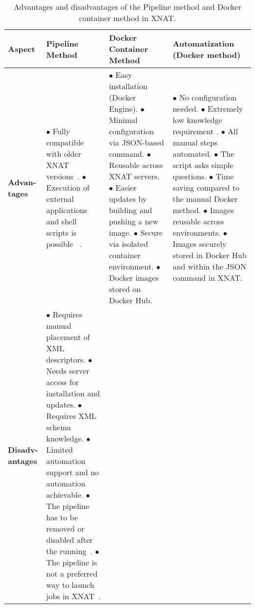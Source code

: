 \begin{table}[htbp]
\centering
\caption{Advantages and disadvantages of the Pipeline method and Docker container method in XNAT.}
\label{tab:adv-disadv}
\renewcommand{\arraystretch}{4}
\begin{tabular}{|p{1cm}|p{3cm}|p{5cm}|p{4cm}|}
\hline
\textbf{Aspect} & \textbf{Pipeline Method} & \textbf{Docker Container Method} & \textbf{Automatization (Docker method)} \\
\hline
\textbf{Advan-tages} &
\parbox[t]{3cm}{
$\bullet$ Fully compatible with older XNAT versions~\cite{Pipelinecompatible}.\\
$\bullet$ Execution of external applications and shell scripts is possible ~\cite{jansen_extending_2015}.
}
&
\parbox[t]{5cm}{
$\bullet$ Easy installation (Docker Engine). \\
$\bullet$ Minimal configuration via JSON-based command.\\
$\bullet$ Reusable across XNAT servers. \\
$\bullet$ Easier updates by building and pushing a new image. \\
$\bullet$ Secure via isolated container environment. \\
$\bullet$ Docker images stored on Docker Hub.\\
}
&
\parbox[t]{3cm}{
$\bullet$ No configuration needed. \\
$\bullet$ Extremely low knowledge requirement . \\
$\bullet$ All manual steps automated. \\
$\bullet$ The script asks simple questions. \\
$\bullet$ Time saving compared to the manual Docker method. \\
$\bullet$ Images reusable across environments. \\
$\bullet$ Images securely stored in Docker Hub and within the JSON command in XNAT.\\
} \\
\hline
\textbf{Disadv-antages} &
\parbox[t]{3cm}{
$\bullet$ Requires manual placement of XML descriptors.\\
$\bullet$ Needs server access for installation and updates.\\
$\bullet$ Requires XML schema knowledge.\\
$\bullet$ Limited automation support and no automation achievable.\\
$\bullet$ The pipeline has to be removed or disabled after the running~\cite{addingpipeline}.\\
$\bullet$ The pipeline is not a preferred way to launch jobs in XNAT~\cite{pipepreference}.\\

}
\end{tabular}
\end{table}
